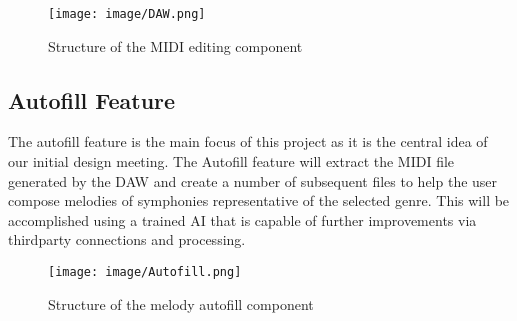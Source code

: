 \begin{figure}[h!]
  \centering
  \texttt{[image: image/DAW.png]}
  \caption{Structure of the MIDI editing component}
  \label{fig:daw_diagram}
\end{figure}

\newpage
\subsection{Autofill Feature}

The autofill feature is the main focus of this project as it is the central idea of our
initial design meeting. The Autofill feature will extract the MIDI file generated by the
DAW and create a number of subsequent files to help the user compose melodies of
symphonies representative of the selected genre. This will be accomplished using a trained
AI that is capable of further improvements via thirdparty connections and processing.

\begin{figure}[h!]
  \centering
  \texttt{[image: image/Autofill.png]}
  \caption{Structure of the melody autofill component}
  \label{fig:autofill_diagram}
\end{figure}
\clearpage
